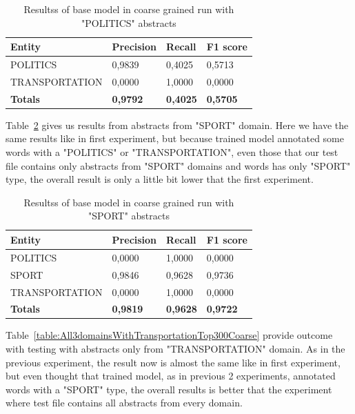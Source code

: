 \documentclass[thesis=M,english]{FITthesis}[2018/05/30]
\begin{document}
	\begin{table}[H]\centering
		\begin{tabular}{|l|l|l|l|}
			\hline {\textbf{Entity}} & {\textbf{Precision}} & {\textbf{Recall}} & {\textbf{F1 score}}\\\hline
				POLITICS & 0,9839 & 0,4025 & 0,5713\\
				TRANSPORTATION & 0,0000 & 1,0000 & 0,0000\\\hline
				\textbf{Totals} & \textbf{0,9792} & \textbf{0,4025} & \textbf{0,5705}\\\hline
		\end{tabular}
		\caption{Resultss of base model in coarse grained run with "POLITICS" abstracts\label{table:All3domainsWithPoliticsTop300Coarse}}
	\end{table}	
	
	Table~\ref{table:All3domainsWithSportTop300Coarse} gives us results from abstracts from "SPORT" domain. Here we have the same results like in first experiment, but because trained model annotated some words with a "POLITICS" or "TRANSPORTATION", even those that our test file contains only abstracts from "SPORT" domains and words has only "SPORT" type, the overall result is only a little bit lower that the first experiment.

	\begin{table}[H]\centering
		\begin{tabular}{|l|l|l|l|}
			\hline {\textbf{Entity}} & {\textbf{Precision}} & {\textbf{Recall}} & {\textbf{F1 score}}\\\hline
				POLITICS & 0,0000 & 1,0000 & 0,0000\\
				SPORT & 0,9846 & 0,9628 & 0,9736\\
				TRANSPORTATION & 0,0000 & 1,0000 & 0,0000\\\hline
				\textbf{Totals} & \textbf{0,9819} & \textbf{0,9628} & \textbf{0,9722}\\\hline
		\end{tabular}
		\caption{Resultss of base model in coarse grained run with "SPORT" abstracts \label{table:All3domainsWithSportTop300Coarse}}
	\end{table}	
	
	Table~\ref{table:All3domainsWithTransportationTop300Coarse} provide outcome with testing with abstracts only from "TRANSPORTATION" domain. As in the previous experiment, the result now is almost the same like in first experiment, but even thought that trained model, as in previous 2 experiments, annotated words with a "SPORT" type, the overall results is better that the experiment where test file contains all abstracts from every domain. 
	
\end{document}
